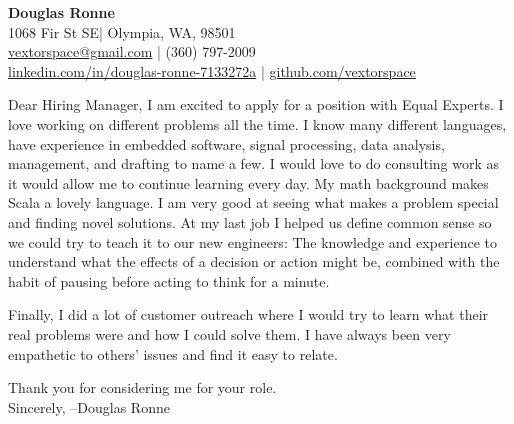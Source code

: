 \documentclass[letter,12pt]{article}
\begin{document}
\begin{center}
    {\Huge \textbf{Douglas Ronne}}\\
    \vspace{2mm}
    1068 Fir St SE| Olympia, WA, 98501\\
    \href{mailto:vextorspace@gmail.com}{vextorspace@gmail.com} | (360) 797-2009\\
    \href{www.linkedin.com/in/douglas-ronne-7133272a}{linkedin.com/in/douglas-ronne-7133272a} | \href{https://github.com/vextorspace}{github.com/vextorspace}
\end{center}

Dear Hiring Manager,
I am excited to apply for a position with Equal Experts. I love working on different problems all the time. I know many different languages, have experience in embedded software, signal processing, data analysis, management, and drafting to name a few. I would love to do consulting work as it would allow me to continue learning every day. My math background makes Scala a lovely language. I am very good at seeing what makes a problem special and finding novel solutions. At my last job I helped us define common sense so we could try to teach it to our new engineers: The knowledge and experience to understand what the effects of a decision or action might be, combined with the habit of pausing before acting to think for a minute.


Finally, I did a lot of customer outreach where I would try to learn what their real problems were and how I could solve them. I have always been very empathetic to others' issues and find it easy to relate.

Thank you for considering me for your role.
\\
Sincerely,
--Douglas Ronne
\end{document}
